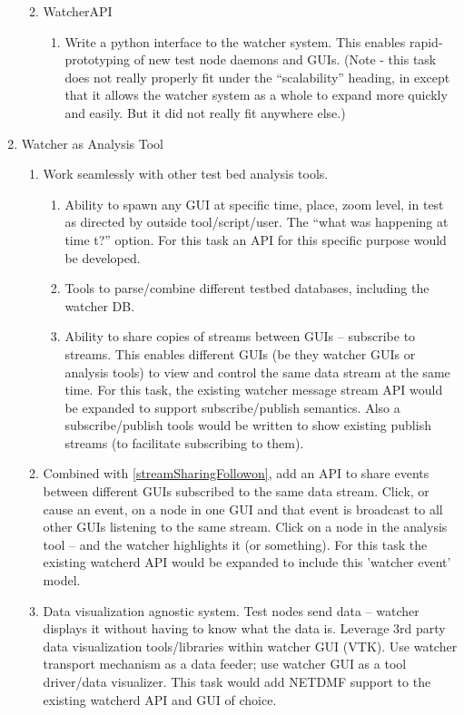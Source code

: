 \documentclass{report}
\begin{document}
\begin{enumerate}
\begin{enumerate}
\begin{enumerate}
    \end{enumerate}
    \item WatcherAPI
    \begin{enumerate}
        \item Write a python interface to the watcher system. This enables rapid-prototyping of new test node daemons and GUIs. (Note - this task does not really properly fit under the “scalability” heading, in except that it allows the watcher system as a whole to expand more quickly and easily. But it did not really fit anywhere else.) 
    \end{enumerate}
\end{enumerate}
\item Watcher as Analysis Tool 
    \begin{enumerate}
    \item Work seamlessly with other test bed analysis tools.
        \begin{enumerate}
            \item Ability to spawn any GUI at specific time, place, zoom level, in test as directed by outside tool/script/user. The “what was happening at time t?” option. For this task an API for this specific purpose would be developed.  
            \item Tools to parse/combine different testbed databases, including the watcher DB.
            \item Ability to share copies of streams between GUIs – subscribe to streams. This enables different GUIs (be they watcher GUIs or analysis tools) to view and control the same data stream at the same time. For this task, the existing watcher message stream API would be expanded to support subscribe/publish semantics. Also a subscribe/publish tools would be written to show existing publish streams (to facilitate subscribing to them).  
            \label{streamSharingFollowon}
        \end{enumerate}
        \item Combined with \ref{streamSharingFollowon}, add an API to share events between different GUIs subscribed to the same data stream. Click, or cause an event, on a node in one GUI and that event is broadcast to all other GUIs listening to the same stream. Click on a node in the analysis tool – and the watcher highlights it (or something). For this task the existing watcherd API would be expanded to include this 'watcher event' model.
        \item Data visualization agnostic system. Test nodes send data – watcher displays it without having to know what the data is. Leverage 3rd party data visualization tools/libraries within watcher GUI (VTK). Use watcher transport mechanism as a data feeder; use watcher GUI as a tool driver/data visualizer. This task would add NETDMF support to the existing watcherd API and GUI of choice. 

\end{enumerate}
\end{enumerate}
\end{document}
